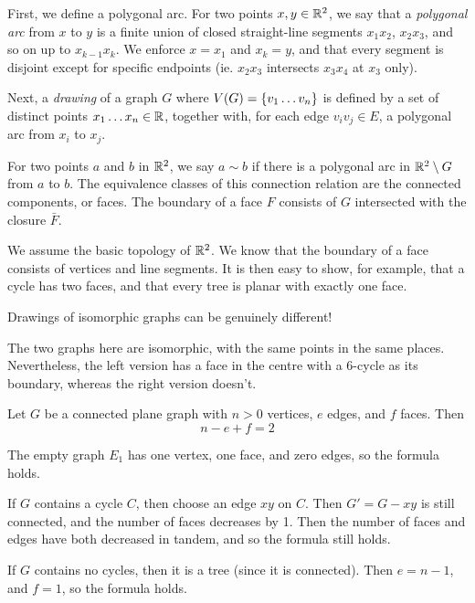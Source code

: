 \documentclass{article}
\begin{document}
First, we define a polygonal arc. For two points $x, y \in \mathbb{R}^2$, we say that a \textit{polygonal arc} from $x$ to $y$ is a finite union of closed straight-line segments $x_1x_2$, $x_2x_3$, and so on up to $x_{k-1}x_k$. We enforce $x = x_1$ and $x_k = y$, and that every segment is disjoint except for specific endpoints (ie. $x_2x_3$ intersects $x_3x_4$ at $x_3$ only).

Next, a \textit{drawing} of a graph $G$ where $V(G) = \left\lbrace v_1 \dots v_n \right\rbrace$ is defined by a set of distinct points $x_1 \dots x_n \in \mathbb{R}$, together with, for each edge $v_i v_j \in E$, a polygonal arc from $x_i$ to $x_j$. 

For two points $a$ and $b$ in $\mathbb{R}^2$, we say $a \sim b$ if there is a polygonal arc in $\mathbb{R}^2 \setminus G$ from $a$ to $b$. The equivalence classes of this connection relation are the connected components, or faces. The boundary of a face $F$ consists of $G$ intersected with the closure $\bar{F}$.

We assume the basic topology of $\mathbb{R}^2$. We know that the boundary of a face consists of vertices and line segments. It is then easy to show, for example, that a cycle has two faces, and that every tree is planar with exactly one face.

\begin{remark}
    Drawings of isomorphic graphs can be genuinely different!
    
    
    The two graphs here are isomorphic, with the same points in the same places. Nevertheless, the left version has a face in the centre with a 6-cycle as its boundary, whereas the right version doesn't.
\end{remark}

\begin{theorem}
    \label{eulers-formula}
    Let $G$ be a connected plane graph with $n > 0$ vertices, $e$ edges, and $f$ faces. Then
    \[
    n - e + f = 2
    \]
\end{theorem}

\begin{prf}
    The empty graph $E_1$ has one vertex, one face, and zero edges, so the formula holds.
    
    If $G$ contains a cycle $C$, then choose an edge $xy$ on $C$. Then $G' = G - xy$ is still connected, and the number of faces decreases by 1. Then the number of faces and edges have both decreased in tandem, and so the formula still holds.
    
    If $G$ contains no cycles, then it is a tree (since it is connected). Then $e = n - 1$, and $f = 1$, so the formula holds.
\end{prf}
\end{document}
